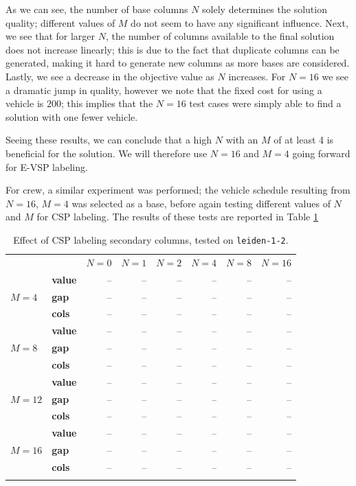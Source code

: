 \documentclass[]{article}
\begin{document}
As we can see, the number of base columns $N$ solely determines the solution quality; different values of $M$ do not seem to have any significant influence. Next, we see that for larger $N$, the number of columns available to the final solution does not increase linearly; this is due to the fact that duplicate columns can be generated, making it hard to generate new columns as more bases are considered. Lastly, we see a decrease in the objective value as $N$ increases. For $N=16$ we see a dramatic jump in quality, however we note that the fixed cost for using a vehicle is $200$; this implies that the $N=16$ test cases were simply able to find a solution with one fewer vehicle. 

Seeing these results, we can conclude that a high $N$ with an $M$ of at least 4 is beneficial for the solution. We will therefore use $N=16$ and $M=4$ going forward for E-VSP labeling.

For crew, a similar experiment was performed; the vehicle schedule resulting from $N=16$, $M=4$ was selected as a base, before again testing different values of $N$ and $M$ for CSP labeling. The results of these tests are reported in Table \ref{tab:csp-secondary-columns} 

\begin{table}[h]
  \centering
  \begin{tabular}{llrrrrrr}
    \toprule
    && $N=0$ & $N=1$ & $N=2$ & $N=4$ & $N=8$ & $N=16$ \\
    \arrayrulecolor{black!30}\cmidrule(lr){1-8}
    \addlinespace[0.4em]
     & \textbf{value}  & -- & -- & -- & -- & -- & -- \\
    $M=4$ & \textbf{gap}   & -- & -- & -- & -- & -- & -- \\
    & \textbf{cols} & -- & -- & -- & -- & -- & -- \\
    \arrayrulecolor{black!30}\cmidrule(lr){1-8}
    & \textbf{value}  & -- & -- & -- & -- & -- & -- \\
    $M=8$ & \textbf{gap}   & -- & -- & -- & -- & -- & -- \\
    & \textbf{cols} & -- & -- & -- & -- & -- & -- \\
    \arrayrulecolor{black!30}\cmidrule(lr){1-8}
    & \textbf{value}  & -- & -- & -- & -- & -- & -- \\
    $M=12$ & \textbf{gap}   & -- & -- & -- & -- & -- & -- \\
    & \textbf{cols} & -- & -- & -- & -- & -- & -- \\
    \arrayrulecolor{black!30}\cmidrule(lr){1-8}
    & \textbf{value}  & -- & -- & -- & -- & -- & -- \\
    $M=16$ & \textbf{gap}   & -- & -- & -- & -- & -- & -- \\
    & \textbf{cols} & -- & -- & -- & -- & -- & -- \\
    \arrayrulecolor{black}\bottomrule
  \end{tabular}
  \caption{Effect of CSP labeling secondary columns, tested on \texttt{leiden-1-2}.}
  \label{tab:csp-secondary-columns}
\end{table}
\end{document}
